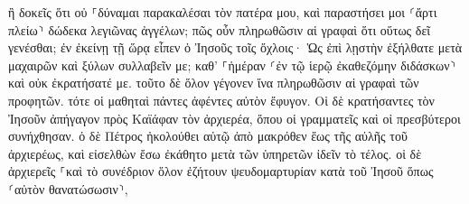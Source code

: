 \documentclass{openreader}
\begin{document}
ἢ δοκεῖς ὅτι οὐ ⸀δύναμαι παρακαλέσαι τὸν πατέρα μου, καὶ παραστήσει μοι ⸂ἄρτι πλείω⸃ δώδεκα λεγιῶνας ἀγγέλων; 
πῶς οὖν πληρωθῶσιν αἱ γραφαὶ ὅτι οὕτως δεῖ γενέσθαι; 
ἐν ἐκείνῃ τῇ ὥρᾳ εἶπεν ὁ Ἰησοῦς τοῖς ὄχλοις· Ὡς ἐπὶ λῃστὴν ἐξήλθατε μετὰ μαχαιρῶν καὶ ξύλων συλλαβεῖν με; καθ’ ⸀ἡμέραν ⸂ἐν τῷ ἱερῷ ἐκαθεζόμην διδάσκων⸃ καὶ οὐκ ἐκρατήσατέ με. 
τοῦτο δὲ ὅλον γέγονεν ἵνα πληρωθῶσιν αἱ γραφαὶ τῶν προφητῶν. τότε οἱ μαθηταὶ πάντες ἀφέντες αὐτὸν ἔφυγον. 
Οἱ δὲ κρατήσαντες τὸν Ἰησοῦν ἀπήγαγον πρὸς Καϊάφαν τὸν ἀρχιερέα, ὅπου οἱ γραμματεῖς καὶ οἱ πρεσβύτεροι συνήχθησαν. 
ὁ δὲ Πέτρος ἠκολούθει αὐτῷ ἀπὸ μακρόθεν ἕως τῆς αὐλῆς τοῦ ἀρχιερέως, καὶ εἰσελθὼν ἔσω ἐκάθητο μετὰ τῶν ὑπηρετῶν ἰδεῖν τὸ τέλος. 
οἱ δὲ ἀρχιερεῖς ⸀καὶ τὸ συνέδριον ὅλον ἐζήτουν ψευδομαρτυρίαν κατὰ τοῦ Ἰησοῦ ὅπως ⸂αὐτὸν θανατώσωσιν⸃, 
\end{document}
